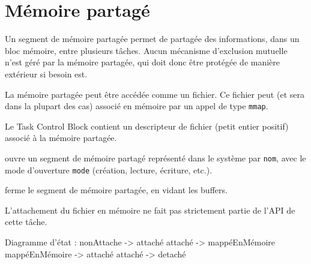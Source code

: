 \section{Mémoire partagé}
Un segment de mémoire partagée permet de partagée des informations, dans un
bloc mémoire, entre plusieurs tâches. Aucun mécanisme d'exclusion mutuelle
n'est géré par la mémoire partagée, qui doit donc être protégée de
manière extérieur si besoin est.

La mémoire partagée peut être accédée comme un fichier. Ce fichier peut (et
sera dans la plupart des cas) associé en mémoire par un appel de type
\texttt{mmap}.

Le Task Control Block contient un descripteur de fichier (petit entier
positif) associé à la mémoire partagée.

    \begin{description}
	\item[\texttt{int mempart\_init(nom, mode)} : ] ouvre un segment de
	    mémoire partagé représenté dans le système par \texttt{nom}, avec le
	    mode d'ouverture \texttt{mode} (création, lecture, écriture, etc.).
	\item[\texttt{int mempart\_fermer(fd)} : ] ferme le segment de mémoire
	partagée, en vidant les buffers.
	\item L'attachement du fichier en mémoire ne fait pas strictement
	partie de l'API de cette tâche.
    \end{description}

Diagramme d'état :
nonAttache -> attaché
attaché -> mappéEnMémoire
mappéEnMémoire -> attaché
attaché -> detaché

